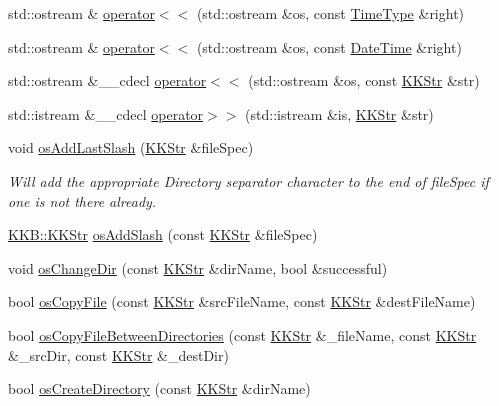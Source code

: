 \begin{DoxyCompactItemize}
\item 
std\+::ostream \& \hyperlink{namespace_k_k_b_a922fc1ce56835e867fbef6cc198ac843}{operator$<$$<$} (std\+::ostream \&os, const \hyperlink{class_k_k_b_1_1_time_type}{Time\+Type} \&right)
\item 
std\+::ostream \& \hyperlink{namespace_k_k_b_a2322ae1bbd07de0943420a3b08a84965}{operator$<$$<$} (std\+::ostream \&os, const \hyperlink{class_k_k_b_1_1_date_time}{Date\+Time} \&right)
\item 
std\+::ostream \&\+\_\+\+\_\+cdecl \hyperlink{namespace_k_k_b_a186440c7d3c43e772dcd6fb5699b5544}{operator$<$$<$} (std\+::ostream \&os, const \hyperlink{class_k_k_b_1_1_k_k_str}{K\+K\+Str} \&str)
\item 
std\+::istream \&\+\_\+\+\_\+cdecl \hyperlink{namespace_k_k_b_aa22d106664a6361ae43bc4198300bc15}{operator$>$$>$} (std\+::istream \&is, \hyperlink{class_k_k_b_1_1_k_k_str}{K\+K\+Str} \&str)
\item 
void \hyperlink{namespace_k_k_b_a60e413a66cd7d3a5679d2844dd5e3d97}{os\+Add\+Last\+Slash} (\hyperlink{class_k_k_b_1_1_k_k_str}{K\+K\+Str} \&file\+Spec)
\begin{DoxyCompactList}\small\item\em Will add the appropriate Directory separator character to the end of file\+Spec if one is not there already. \end{DoxyCompactList}\item 
\hyperlink{class_k_k_b_1_1_k_k_str}{K\+K\+B\+::\+K\+K\+Str} \hyperlink{namespace_k_k_b_aa0d40119b911df4283399a1724cab1ef}{os\+Add\+Slash} (const \hyperlink{class_k_k_b_1_1_k_k_str}{K\+K\+Str} \&file\+Spec)
\item 
void \hyperlink{namespace_k_k_b_a9957b62bf4f4d33e0ba12e8996a1ce79}{os\+Change\+Dir} (const \hyperlink{class_k_k_b_1_1_k_k_str}{K\+K\+Str} \&dir\+Name, bool \&successful)
\item 
bool \hyperlink{namespace_k_k_b_ac7e7e3ed089d3a8ce79c855a1201dd98}{os\+Copy\+File} (const \hyperlink{class_k_k_b_1_1_k_k_str}{K\+K\+Str} \&src\+File\+Name, const \hyperlink{class_k_k_b_1_1_k_k_str}{K\+K\+Str} \&dest\+File\+Name)
\item 
bool \hyperlink{namespace_k_k_b_a054318e7c9ef534d3aa861074ebd3e12}{os\+Copy\+File\+Between\+Directories} (const \hyperlink{class_k_k_b_1_1_k_k_str}{K\+K\+Str} \&\+\_\+file\+Name, const \hyperlink{class_k_k_b_1_1_k_k_str}{K\+K\+Str} \&\+\_\+src\+Dir, const \hyperlink{class_k_k_b_1_1_k_k_str}{K\+K\+Str} \&\+\_\+dest\+Dir)
\item 
bool \hyperlink{namespace_k_k_b_a2a7789149e2db5796fd7fdf6566db21e}{os\+Create\+Directory} (const \hyperlink{class_k_k_b_1_1_k_k_str}{K\+K\+Str} \&dir\+Name)

\end{DoxyCompactItemize}
